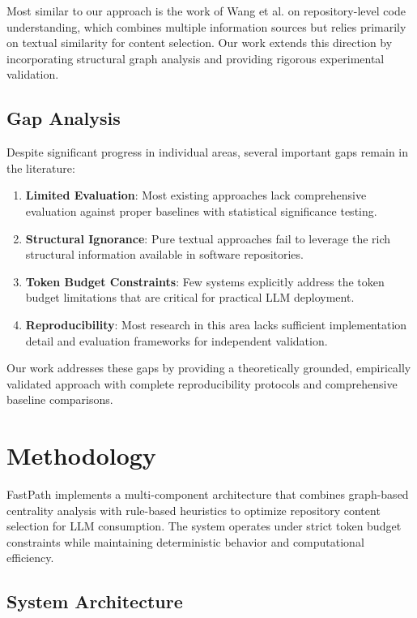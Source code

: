 \documentclass[conference]{IEEEtran}
\begin{document}
Most similar to our approach is the work of Wang et al. \cite{wang2023codet5+} on repository-level code understanding, which combines multiple information sources but relies primarily on textual similarity for content selection. Our work extends this direction by incorporating structural graph analysis and providing rigorous experimental validation.

\subsection{Gap Analysis}

Despite significant progress in individual areas, several important gaps remain in the literature:

\begin{enumerate}
\item \textbf{Limited Evaluation}: Most existing approaches lack comprehensive evaluation against proper baselines with statistical significance testing.

\item \textbf{Structural Ignorance}: Pure textual approaches fail to leverage the rich structural information available in software repositories.

\item \textbf{Token Budget Constraints}: Few systems explicitly address the token budget limitations that are critical for practical LLM deployment.

\item \textbf{Reproducibility}: Most research in this area lacks sufficient implementation detail and evaluation frameworks for independent validation.
\end{enumerate}

Our work addresses these gaps by providing a theoretically grounded, empirically validated approach with complete reproducibility protocols and comprehensive baseline comparisons.

\section{Methodology}

FastPath implements a multi-component architecture that combines graph-based centrality analysis with rule-based heuristics to optimize repository content selection for LLM consumption. The system operates under strict token budget constraints while maintaining deterministic behavior and computational efficiency.

\subsection{System Architecture}
\end{document}
